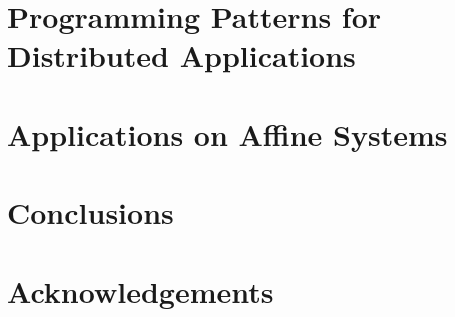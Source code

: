 \documentclass{article}
\begin{document}
\section{Programming Patterns for Distributed Applications}
\label{sec:patterns}

\section{Applications on Affine Systems}
\label{sec:apps}


\section{Conclusions}
\label{sec:conclusion}

\section{Acknowledgements}
\label{sec:acks}



\end{document}

